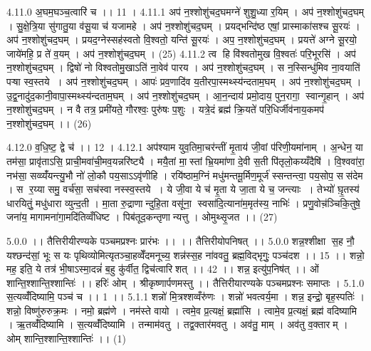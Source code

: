 4.11.0
अ॒घम॒घञ्च॒त्वारि॑ च ।। 11 ।
4.11.1
अप॑ न॒श्शोशु॑चद॒घमग्ने॑ शुशु॒ध्या र॒यिम् । अप॑ न॒श्शोशु॑चद॒घम् । सु॒क्षे॒त्रि॒या सु॑गातु॒या व॑सू॒या च॑ यजामहे । अप॑ न॒श्शोशु॑चद॒घम् । प्रयद्भन्दि॑ष्ठ एषां॒ प्रास्माका॑सश्च सू॒रयः॑ । अप॑ न॒श्शोशु॑चद॒घम् । प्रयद॒ग्नेस्सह॑स्वतो वि॒श्वतो॒ यन्ति॑ सू॒रयः॑ । अप॒ न॒श्शोशु॑चद॒घम् । प्रयत्ते॑ अग्ने सू॒रयो॒ जाये॑महि॒ प्र ते॑ व॒यम् । अप॑ न॒श्शोशु॑चद॒घम् । (25)
4.11.2
त्व हि वि॑श्वतोमुख वि॒श्वतः॑ परि॒भूरसि॑ । अप॑ न॒श्शोशु॑चद॒घम् । द्विषो॑ नो विश्वतोमु॒खाऽति॑ ना॒वेव॑ पारय । अप॑ न॒श्शोशु॑चद॒घम् । स न॒स्सिन्धु॑मिव ना॒वयाति॑ पऱ्षा स्व॒स्तये । अप॑ न॒श्शोशु॑चद॒घम् । आपः॑ प्रव॒णादि॑व य॒तीरपा॒स्मथ्स्य॑न्दताम॒घम् । अप॑ न॒श्शोशु॑चद॒घम् । उ॒द्व॒नादु॑द॒कानी॒वापा॒स्मथ्स्य॑न्दताम॒घम् । अप॑ न॒श्शोशु॑चद॒घम् । आ॒न॒न्दाय॑ प्रमो॒दाय॒ पुन॒रागा॒ स्वान्गृ॒हान् । अप॑ न॒श्शोशु॑चद॒घम् । न वै तत्र॒ प्रमी॑यते॒ गौरश्वः॒ पुरु॑षः प॒शुः । यत्रे॒दं ब्रह्म॑ क्रि॒यते॑ परि॒धिर्जीव॑नाय॒कमप॑ न॒श्शोशु॑चद॒घम् ।। (26)
\anuvakamend

4.12.0
व॒धि॒ष्ट॒ द्वे च॑ ।। 12 ।
4.12.1
अप॑श्याम युव॒तिमा॒चर॑न्तीं मृ॒ताय॑ जी॒वां प॑रिणी॒यमा॑नाम् । अ॒न्धेन॒ या तम॑सा॒ प्रावृ॑ताऽसि॒ प्राची॒मवा॑ची॒मव॒यन्नरि॑ष्ट्यै । मयै॒तां मा॒स्तां भ्रि॒यमा॑णा दे॒वी स॒ती पि॑तृलो॒कय्यँदैषि॑ । वि॒श्ववा॑रा॒ नभ॑सा॒ सव्व्यँ॑यन्त्यु॒भौ नो॑ लो॒कौ पय॒साऽऽवृ॑णीहि । रयि॑ष्ठाम॒ग्निं मधु॑मन्तमू॒र्मिण॒मूर्ज॑ स्सन्तन्त्वा॒ पय॒सोप॒ सस॑देम । स र॒य्या समु॒ वर्च॑सा॒ सच॑स्वा नस्स्व॒स्तये । ये जी॒वा ये च॑ मृ॒ता ये जा॒ता ये च॒ जन्त्याः । तेभ्यो॑ घ़ृ॒तस्य॑ धारयितुं॒ मधु॑धारा व्युन्द॒ती । मा॒ता रु॒द्राणान्दुहि॒ता वसू॑ना॒ स्वसा॑दि॒त्याना॑म॒मृत॑स्य॒ नाभिः॑ । प्रणु॒वोच़॑ञ्चिकि॒तुषे॒ जना॑य॒ मागामना॑गा॒मदि॑तिव्वँधिष्ट । पिब॑तूद॒कन्तृणान्यत्तु । ओमुथ्सृ॒जत ।। (27)

\setcounter{anuvakam}{0}
5.0.0
।। तैत्तिरीयीरण्यके पञ्चमप्रश्नः प्रारंभः ।। ।। तैत्तिरीयोपनिषत् ।।
5.0.0
शन्न॒श्शीक्षा स॒ह नौ॒ यश्छन्द॑सां॒ भूः स यः पृथिव्योमित्यृतञ्चा॒हव्वेँदमनूच्य॒ शन्न॑स्स॒ह ना॑ववतु॒ ब्रह्म॒विद्भृगुः॒ पञ्च॑दश ।। 15 ।। शन्नो॒ मह॒ इति॒ ये तत्र॑ भी॒षाऽस्मा॒दन्नं॑ ब॒हु कु॑र्वीत॒ द्विच॑त्वारिशत् ।। 42 ।। शन्न॒ इत्यु॑प॒निष॑त् ।। ओं शान्ति॒श्शान्ति॒श्शान्तिः॑ ।। हरिः॑ ओम् । श्रीकृष्णार्पणमस्तु ।। तैत्तिरीयारण्यके पञ्चमप्रश्नः समाप्तः ।
5.1.0
स॒त्यव्वँ॑दिष्यामि॒ पञ्च॑ च ।। 1 ।।
5.1.1
शन्नो॑ मि॒त्रश्शव्वँरु॑णः । शन्नो॑ भवत्वर्य॒मा । शन्न॒ इन्द्रो॒ बृह॒स्पतिः॑ । शन्नो॒ विष्णु॑रुरुक्र॒मः । नमो॒ ब्रह्म॑णे । नम॑स्ते वायो । त्वमे॒व प्र॒त्यक्षं॒ ब्रह्मा॑सि । त्वामे॒व प्र॒त्यक्षं॒ ब्रह्म॑ वदिष्यामि । ऋ॒तव्वँ॑दिष्यामि । स॒त्यव्वँ॑दिष्यामि । तन्माम॑वतु । तद्व॒क्तार॑मवतु । अव॑तु॒ माम् । अव॑तु व॒क्तारम् । ओम् शान्ति॒श्शान्ति॒श्शान्तिः॑ ।। (1)
\anuvakamend

